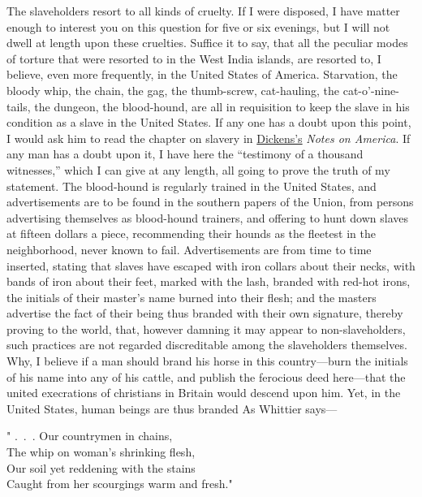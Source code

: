 The slaveholders resort to all kinds of cruelty. If I were disposed, I
have matter enough to interest you on this question for
{\protect\hypertarget{410}{}{}}five or six evenings, but I will not
dwell at length upon these cruelties. Suffice it to say, that all the
peculiar modes of torture that were resorted to in the West India
islands, are resorted to, I believe, even more frequently, in the United
States of America. Starvation, the bloody whip, the chain, the gag, the
thumb-screw, cat-hauling, the cat-o'-nine-tails, the dungeon, the
blood-hound, are all in requisition to keep the slave in his condition
as a slave in the United States. If any one has a doubt upon this point,
I would ask him to read the chapter on slavery in
\href{/wiki/Author:Charles_Dickens}{Dickens's} \emph{Notes on America}.
If any man has a doubt upon it, I have here the ``testimony of a
thousand witnesses,'' which I can give at any length, all going to prove
the truth of my statement. The blood-hound is regularly trained in the
United States, and advertisements are to be found in the southern papers
of the Union, from persons advertising themselves as blood-hound
trainers, and offering to hunt down slaves at fifteen dollars a piece,
recommending their hounds as the fleetest in the neighborhood, never
known to fail. Advertisements are from time to time inserted, stating
that slaves have escaped with iron collars about their necks, with bands
of iron about their feet, marked with the lash, branded with red-hot
irons, the initials of their master's name burned into their flesh; and
the masters advertise the fact of their being thus branded with their
own signature, thereby proving to the world, that, however damning it
may appear to non-slaveholders, such practices are not regarded
discreditable among the slaveholders themselves. Why, I believe if a man
should brand his horse in this country---burn the initials of his name
into any of his cattle, and publish the ferocious deed here---that the
united execrations of christians in Britain would descend upon him. Yet,
in the United States, human beings are thus branded As Whittier says---

{"} {.~.~.} Our countrymen in chains,\\
{﻿}The whip on woman's shrinking flesh,\\
Our soil yet reddening with the stains\\
{﻿}Caught from her scourgings warm and fresh."

